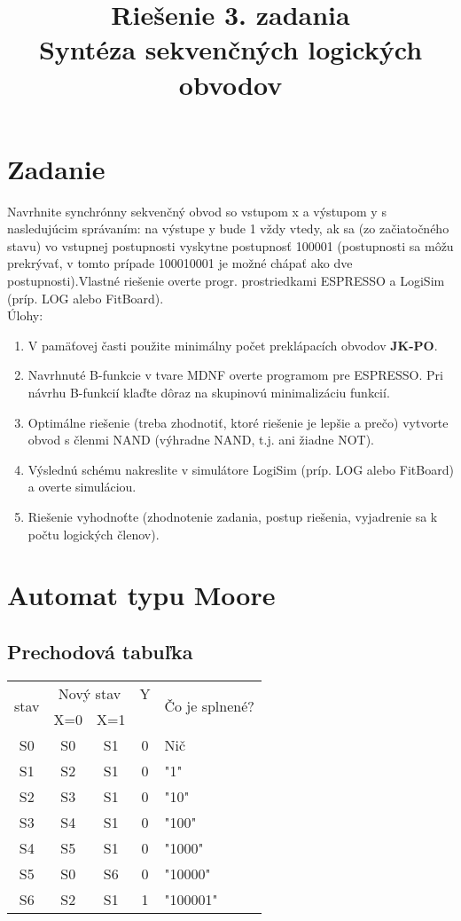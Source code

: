 \documentclass{article}
\author{}
\date{}
\title{Riešenie 3. zadania\\Syntéza sekvenčných logických obvodov}
\begin{document}
\maketitle
\thispagestyle{fancy}
\section{Zadanie}
Navrhnite synchrónny sekvenčný obvod so vstupom x a výstupom y s nasledujúcim 
správaním: na výstupe y bude 1 vždy vtedy, ak sa (zo začiatočného stavu) vo vstupnej 
postupnosti vyskytne postupnosť 100001 (postupnosti sa môžu prekrývať, v tomto prípade 
100010001 je možné chápať ako dve postupnosti).Vlastné  riešenie overte  progr. prostriedkami 
ESPRESSO a LogiSim (príp. LOG alebo FitBoard).\\
Úlohy:
\begin{enumerate}
\item V pamäťovej časti použite minimálny počet preklápacích obvodov \textbf{JK-PO}.
\item Navrhnuté B-funkcie v tvare MDNF overte programom pre ESPRESSO. Pri návrhu 
B-funkcií klaďte dôraz na skupinovú minimalizáciu funkcií.
\item Optimálne riešenie (treba zhodnotiť, ktoré riešenie je lepšie a prečo) vytvorte obvod s 
členmi NAND (výhradne NAND, t.j. ani žiadne NOT).
\item Výslednú schému nakreslite v simulátore LogiSim (príp. LOG alebo FitBoard) 
a overte simuláciou.
\item Riešenie vyhodnoťte (zhodnotenie zadania, postup riešenia, vyjadrenie sa k počtu 
logických členov).
\end{enumerate}
\pagebreak

\section{Automat typu Moore}

\subsection{Prechodová tabuľka}
\begin{tabular}{c|c|c|c|l|}
\multirow{2}{*}{stav}&\multicolumn{2}{|c|}{Nový stav}&Y&\multirow{2}{1.3cm}{Čo je splnené?}\\ \cline{2-4}
&X=0&X=1&&\\ \hline
S0&S0&S1&0&Nič \\ \hline
S1&S2&S1&0&"1" \\ \hline
S2&S3&S1&0&"10" \\ \hline
S3&S4&S1&0&"100" \\ \hline
S4&S5&S1&0&"1000" \\ \hline
S5&S0&S6&0&"10000" \\ \hline
S6&S2&S1&1&"100001" \\ \hline
\end{tabular}
\end{document}
